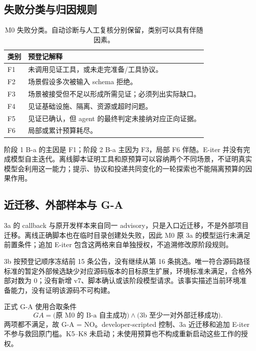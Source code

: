 \subsection{失败分类与归因规则}
\begin{table}[htbp]
\centering\small
\begin{tabularx}{\textwidth}{L{11mm}Y}
\toprule 类别 & 预登记解释\\\midrule
F1 & 未调用见证工具，或未走完准备/工具协议。\\
F2 & 场景假设多次被输入 schema 拒绝。\\
F3 & 场景被接受但不足以形成所需见证；必须列出实际缺口。\\
F4 & 见证基础设施、隔离、资源或超时问题。\\
F5 & 见证已确认，但 agent 的最终判定未接纳对应正向证据。\\
F6 & 局部或累计预算耗尽。\\
\bottomrule
\end{tabularx}
\caption{M0 失败分类。自动诊断与人工复核分别保留，类别可以具有伴随因素。}
\end{table}

阶段 1 B-a 的主因是 F1；阶段 2 B-a 主因为 F3，局部 F6 伴随。E-iter 并没有完成模型自主迭代。离线脚本证明工具和原预算可以容纳两个不同场景，不证明真实模型会利用这一能力；提示、协议和投递共同变化的一轮探索也不能隔离预算的因果作用。

\subsection{近迁移、外部样本与 G-A}
3a 的 callback 与原开发样本来自同一 advisory，只是入口近迁移，不是外部项目迁移。离线正确脚本也在临时目录创建处失败，因此 M0 原 3a 的模型运行未满足前置条件；追加 E-iter 包含这两格来自单独授权，不追溯修改原阶段规则。

3b 按预登记顺序冻结前 15 条公告，没有继续从第 16 条挑选。唯一符合源码路径标准的暂定外部候选缺少对应源码版本的目标原生扩展，环境标准未满足，合格外部对数为 0；没有新增 v7、脚本确认或该阶段模型请求。该事实描述当前环境准备能力，没有证明该源码不可构建。

正式 G-A 使用合取条件
\begin{equation}
G\!A=\bigl(\text{原 M0 的 B-a 自主成功}\bigr)
\land\bigl(\text{3b 至少一对外部迁移成功}\bigr).
\end{equation}
两项都不满足，故 G-A = NO。developer-scripted 控制、3a 近迁移和追加 E-iter 不参与救回原门槛。K5--K8 未启动；未使用预算也不构成重新启动这些工作的授权。\cite{gate}


